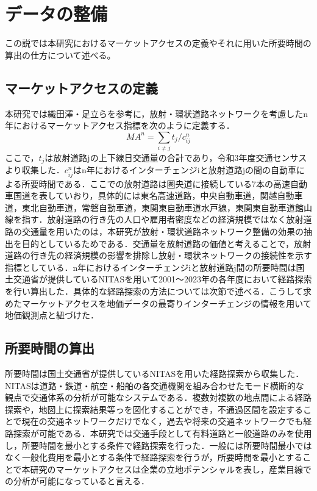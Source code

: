 \section{データの整備}
この説では本研究におけるマーケットアクセスの定義やそれに用いた所要時間の算出の仕方について述べる。

\subsection{マーケットアクセスの定義}
本研究では織田澤・足立らを参考に，放射・環状道路ネットワークを考慮したn年におけるマーケットアクセス指標を次のように定義する．
\[MA^{n} = \sum_{i \neq j}{t_{j}/c^{n}_{ij}}\]
ここで，$t_{j}$は放射道路jの上下線日交通量の合計であり，令和3年度交通センサスより収集した．$c^{n}_{ij}$はn年におけるインターチェンジiと放射道路jの間の自動車による所要時間である．ここでの放射道路は圏央道に接続している7本の高速自動車国道を表していおり，具体的には東名高速道路，中央自動車道，関越自動車道，東北自動車道，常磐自動車道，東関東自動車道水戸線，東関東自動車道館山線を指す．放射道路の行き先の人口や雇用者密度などの経済規模ではなく放射道路の交通量を用いたのは，本研究が放射・環状道路ネットワーク整備の効果の抽出を目的としているためである．交通量を放射道路の価値と考えることで，放射道路の行き先の経済規模の影響を排除し放射・環状ネットワークの接続性を示す指標としている．n年におけるインターチェンジiと放射道路j間の所要時間は国土交通省が提供しているNITASを用いて2001〜2023年の各年度において経路探索を行い算出した．具体的な経路探索の方法については次節で述べる．こうして求めたマーケットアクセスを地価データの最寄りインターチェンジの情報を用いて地価観測点と紐づけた．


\subsection{所要時間の算出}
所要時間は国土交通省が提供しているNITASを用いた経路探索から収集した．NITASは道路・鉄道・航空・船舶の各交通機関を組み合わせたモード横断的な観点で交通体系の分析が可能なシステムである．複数対複数の地点間による経路探索や，地図上に探索結果等っを図化することができ，不通過区間を設定することで現在の交通ネットワークだけでなく，過去や将来の交通ネットワークでも経路探索が可能である．本研究では交通手段として有料道路と一般道路のみを使用し，所要時間を最小とする条件で経路探索を行った．一般には所要時間最小ではなく一般化費用を最小とする条件で経路探索を行うが，所要時間を最小とすることで本研究のマーケットアクセスは企業の立地ポテンシャルを表し，産業目線での分析が可能になっていると言える．


